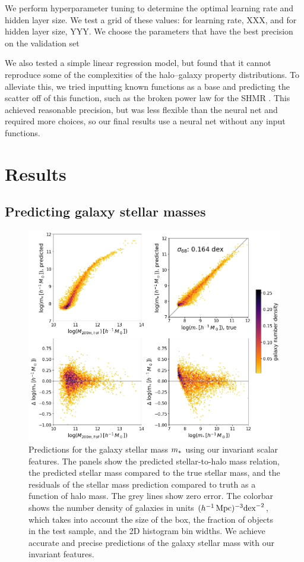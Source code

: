 We perform hyperparameter tuning to determine the optimal learning rate and hidden layer size.
We test a grid of these values: for learning rate, XXX, and for hidden layer size, YYY.
We choose the parameters that have the best precision on the validation set





We also tested a simple linear regression model, but found that it cannot reproduce some of the complexities of the halo--galaxy property distributions.
To alleviate this, we tried inputting known functions as a base and predicting the scatter off of this function, such as the broken power law for the SHMR \citep{}.
This achieved reasonable precision, but was less flexible than the neural net and required more choices, so our final results use a neural net without any input functions.

\section{Results}
\label{sec:results}

\subsection{Predicting galaxy stellar masses}
\label{sec:pred_mstellar}

\begin{figure}
    \centering
    \includegraphics[width=0.7\columnwidth]{pred_mstellar.png}
    \caption{Predictions for the galaxy stellar mass $m_*$ using our invariant scalar features. The panels show the predicted stellar-to-halo mass relation, the predicted stellar mass compared to the true stellar mass, and the residuals of the stellar mass prediction compared to truth as a function of halo mass. The grey lines show zero error. The colorbar shows the number density of galaxies in units $(h^{-1}\,\mathrm{Mpc})^{-3} \text{dex}^{-2}$, which takes into account the size of the box, the fraction of objects in the test sample, and the 2D histogram bin widths. We achieve accurate and precise predictions of the galaxy stellar mass with our invariant features.}
    \label{fig:mstellar}
\end{figure}

